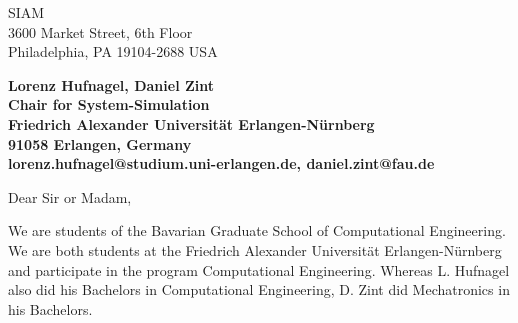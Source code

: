 \documentclass[11pt]{letter} %
\begin{document}

\begin{letter}{SIAM \\
3600 Market Street, 6th Floor \\
Philadelphia, PA 19104-2688 USA}


\begin{center}
\large\bf Lorenz Hufnagel, Daniel Zint \\ %
Chair for System-Simulation \\ 
Friedrich Alexander Universit\"at Erlangen-N\"urnberg \\ 
91058 Erlangen, Germany \\
lorenz.hufnagel@studium.uni-erlangen.de, daniel.zint@fau.de
\end{center} 
\vfill

\signature{Lorenz Hufnagel, Daniel Zint} %


\opening{Dear Sir or Madam,} 



We are students of the Bavarian Graduate School of Computational Engineering. We are both students at the Friedrich Alexander Universit\"at Erlangen-N\"urnberg and participate in the program Computational Engineering. Whereas L. Hufnagel also did his Bachelors in Computational Engineering, D. Zint did Mechatronics in his Bachelors.


\end{letter}
\end{document}
